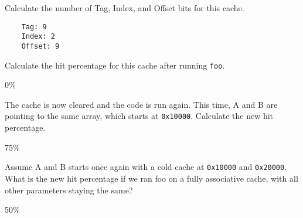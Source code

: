 \begin{blocksection}
\question
Calculate the number of Tag, Index, and Offset bits for this cache.
\begin{solution}
    \begin{verbatim}
    Tag: 9
    Index: 2
    Offset: 9
    \end{verbatim}
\end{solution}


\question
Calculate the hit percentage for this cache after running \lstinline$foo$.
\begin{solution}
0\%
\end{solution}


\question
The cache is now cleared and the code is run again. This time, A and B are pointing to the same array, which starts at \lstinline$0x10000$. Calculate the new hit percentage.
\begin{solution}
75\%
\end{solution}


\question
Assume A and B starts once again with a cold cache at \lstinline$0x10000$ and \lstinline$0x20000$. What is the new hit percentage if we ran foo on a fully associative cache, with all other parameters staying the same?
\begin{solution}
50\%
\end{solution}

\end{blocksection}